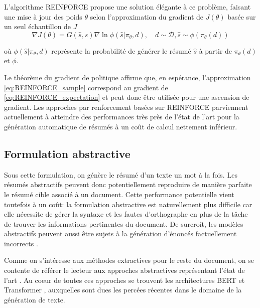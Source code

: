 L'algorithme REINFORCE \citep{williams1992simple} propose une
solution élégante à ce problème, faisant une mise à jour des poids $\theta$ 
selon l'approximation du gradient de $J(\theta)$ basée sur un seul échantillon de $J$ 
\begin{equation}
    \nabla J(\theta) = G(\hat{s}, s)\nabla \ln \phi(\hat{s} | \pi_\theta, d), \quad d \sim \mathcal{D}, \hat{s} \sim \phi (\pi_\theta(d))
    \label{eq:REINFORCE_sample}
\end{equation}

où $\phi(\hat{s} | \pi_\theta, d)$ représente la probabilité de générer le résumé 
$\hat{s}$ à partir de $\pi_\theta(d)$ et $\phi$.


Le théorème du gradient de politique \citep{sutton1999policy} affirme que, en espérance,
l'approximation \eqref{eq:REINFORCE_sample} correspond au gradient de \eqref{eq:REINFORCE_expectation}
et peut donc être utilisée pour une ascension de gradient.
Les approches par renforcement basées sur REINFORCE \citep{dong2018banditsum,luo-etal-2019-reading}
parviennent actuellement à atteindre des performances très près de l'état
de l'art pour la génération automatique de résumés à un coût de calcul 
nettement inférieur.

\subsection{Formulation abstractive}

Sous cette formulation, on génère le résumé d'un texte un mot à la fois.
Les résumés abstractifs peuvent donc potentiellement reproduire 
de manière parfaite le résumé cible associé à un document.
Cette performance potentielle vient toutefois à un coût:
la formulation abstractive est naturellement plus difficile car elle nécessite de
gérer la syntaxe et les fautes d'orthographe en plus de la tâche 
de trouver les informations pertinentes du document.
De surcroît, les modèles abstractifs peuvent aussi être sujets à la génération 
d'énoncés factuellement incorrects \citep{kryscinski2020evaluating} .

Comme on s'intéresse aux méthodes extractives pour le reste du document,
on se contente de référer le lecteur aux approches abstractives
représentant l'état de l'art \citep{dou2020gsum, 2020t5, unilm, zhang2019pegasus}.
Au coeur de toutes ces approches se trouvent les architectures BERT 
\citep{devlin-etal-2019-bert} et Transformer \citep{vaswani2017attention},
auxquelles sont dues les percées récentes dans le domaine de la génération 
de texte.

